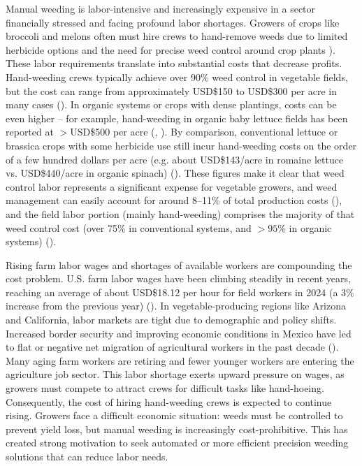 \documentclass[letterpaper, notitlepage]{report}
\begin{document}
Manual weeding is labor-intensive and increasingly expensive in a sector financially stressed and facing profound labor shortages. Growers of crops like broccoli and melons often must hire crews to hand-remove weeds due to limited herbicide options and the need for precise weed control around crop plants \cite{American-Society-of-Agronomy2018-ad}). These labor requirements translate into substantial costs that decrease profits. Hand-weeding crews typically achieve over 90\% weed control in vegetable fields, but the cost can range from approximately USD\$150 to USD\$300 per acre in many cases (\cite{American-Society-of-Agronomy2018-ad}). In organic systems or crops with dense plantings, costs can be even higher – for example, hand-weeding in organic baby lettuce fields has been reported at $>$USD\$500 per acre (\cite{Fennimore2014-dc}, \cite{Kushal2024-jt}). By comparison, conventional lettuce or brassica crops with some herbicide use still incur hand-weeding costs on the order of a few hundred dollars per acre (e.g. about USD\$143/acre in romaine lettuce vs. USD\$440/acre in organic spinach) (\cite{Tourte2016-hx}). These figures make it clear that weed control labor represents a significant expense for vegetable growers, and weed management can easily account for around 8–11\% of total production costs (\cite{Tourte2016-hx}), and the field labor portion (mainly hand-weeding) comprises the majority of that weed control cost (over 75\% in conventional systems, and $>95\%$ in organic systems) (\cite{Tourte2016-hx}).

Rising farm labor wages and shortages of available workers are compounding the cost problem. U.S. farm labor wages have been climbing steadily in recent years, reaching an average of about USD\$18.12 per hour for field workers in 2024 (a 3\% increase from the previous year) (\cite{USDA2024-pq}). In vegetable-producing regions like Arizona and California, labor markets are tight due to demographic and policy shifts. Increased border security and improving economic conditions in Mexico have led to flat or negative net migration of agricultural workers in the past decade (\cite{Tourte2016-hx}). Many aging farm workers are retiring and fewer younger workers are entering the agriculture job sector. This labor shortage exerts upward pressure on wages, as growers must compete to attract crews for difficult tasks like hand-hoeing. Consequently, the cost of hiring hand-weeding crews is expected to continue rising. Growers face a difficult economic situation: weeds must be controlled to prevent yield loss, but manual weeding is increasingly cost-prohibitive. This has created strong motivation to seek automated or more efficient precision weeding solutions that can reduce labor needs.
\end{document}
